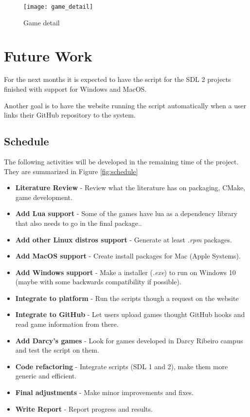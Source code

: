 \begin{figure}[h!]
\centering
\texttt{[image: game\_detail]}
\caption{Game detail}
\label{fig:game_detail}
\end{figure}

\section[Future Work]{Future Work}

For the next months it is expected to have the script for the SDL 2 projects finished with support for Windows and MacOS.

Another goal is to have the website running the script automatically when a user links their GitHub repository to the system.


\subsection[Schedule]{Schedule}

The following activities will be developed in the remaining time of the project. They are summarized in Figure \ref{fig:schedule}

\begin{itemize}
\item \textbf{Literature Review} - Review what the literature has on packaging, CMake, game development.
\item \textbf{Add Lua support} - Some of the games have lua as a dependency library that also needs to go in the final package..
\item \textbf{Add other Linux distros support} - Generate at least \textit{.rpm} packages.
\item \textbf{Add MacOS support} - Create install packages for Mac (Apple Systems).
\item \textbf{Add Windows support} - Make a installer (\textit{.exe}) to run on Windows 10 (maybe with some backwards compatibility if possible).
\item \textbf{Integrate to platform} - Run the scripts though a request on the website
\item \textbf{Integrate to GitHub} - Let users upload games thought GitHub hooks and read game information from there.
\item \textbf{Add Darcy's games} - Look for games developed in Darcy Ribeiro campus and test the script on them.
\item \textbf{Code refactoring} - Integrate scripts (SDL 1 and 2), make them more generic and efficient.
\item \textbf{Final adjustments} - Make minor improvements and fixes.
\item \textbf{Write Report} - Report progress and results.
\end{itemize}

